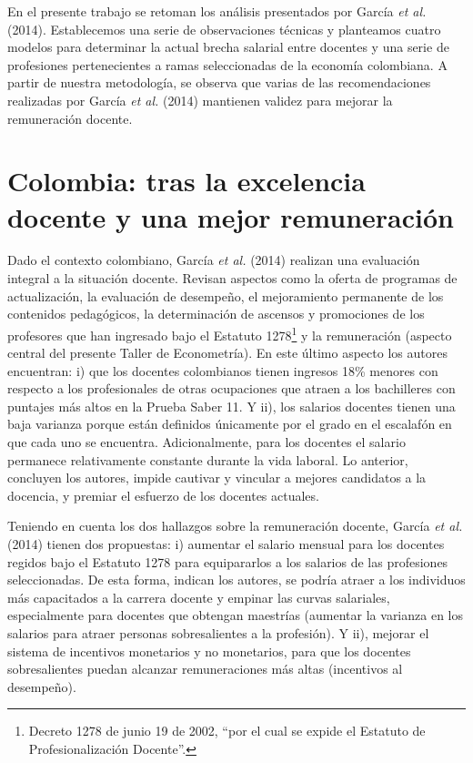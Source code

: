 \documentclass[a4paper]{article}
\begin{document}
En el presente trabajo se retoman los análisis presentados por García \textit{et al.} (2014). Establecemos una serie de observaciones técnicas y planteamos cuatro modelos para determinar la actual brecha salarial entre docentes y una serie de profesiones pertenecientes a ramas seleccionadas de la economía colombiana. A partir de nuestra metodología, se observa que varias de las recomendaciones realizadas por García \textit{et al.} (2014) mantienen validez para mejorar la remuneración docente.
    
    \section{Colombia: tras la excelencia docente y una mejor remuneración}
Dado el contexto colombiano, García \textit{et al.} (2014) realizan una evaluación integral a la situación docente. Revisan aspectos como la oferta de programas de actualización, la evaluación de desempeño, el mejoramiento permanente de los contenidos pedagógicos, la determinación de ascensos y promociones de los profesores que han ingresado bajo el Estatuto 1278\footnote{Decreto 1278 de junio 19 de 2002, “por el cual se expide el Estatuto de Profesionalización Docente”.} y la remuneración (aspecto central del presente Taller de Econometría). En este último aspecto los autores encuentran: i) que los docentes colombianos tienen ingresos 18\% menores con respecto a los profesionales de otras ocupaciones que atraen a los bachilleres con puntajes más altos en la Prueba Saber 11. Y ii), los salarios docentes tienen una baja varianza porque están definidos únicamente por el grado en el escalafón en que cada uno se encuentra. Adicionalmente, para los docentes el salario permanece relativamente constante durante la vida laboral. Lo anterior, concluyen los autores, impide cautivar y vincular a mejores candidatos a la docencia, y premiar el esfuerzo de los docentes actuales.

Teniendo en cuenta los dos hallazgos sobre la remuneración docente, García \textit{et al.} (2014) tienen dos propuestas: i) aumentar el salario mensual para los docentes regidos bajo el Estatuto 1278 para equipararlos a los salarios de las profesiones seleccionadas. De esta forma, indican los autores, se podría atraer a los individuos más capacitados a la carrera docente y empinar las curvas salariales, especialmente para docentes que obtengan maestrías (aumentar la varianza en los salarios para atraer personas sobresalientes a la profesión). Y ii), mejorar el sistema de incentivos monetarios y no monetarios, para que los docentes sobresalientes puedan alcanzar remuneraciones más altas (incentivos al desempeño).
\end{document}
